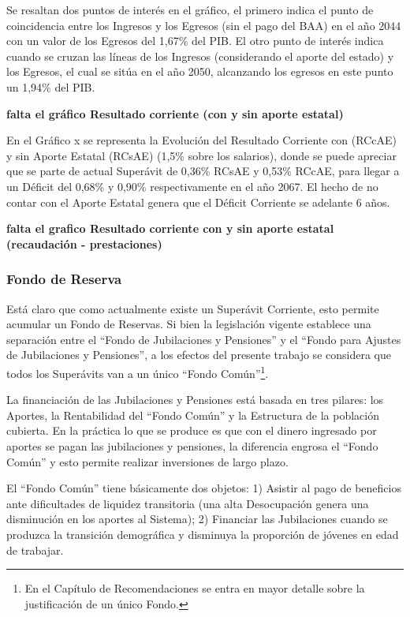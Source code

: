 \documentclass[a4paper,11pt]{article}
\begin{document}
Se resaltan dos puntos de interés en el gráfico, el primero indica el punto de coincidencia entre los Ingresos y los Egresos (sin el pago del BAA) en el año 2044 con un valor de los Egresos del 1,67\% del PIB. El otro punto de interés indica cuando se cruzan las líneas de los Ingresos (considerando el aporte del estado) y los Egresos, el cual se sitúa en el año 2050, alcanzando los egresos en este punto un 1,94\% del PIB.

\textbf{falta el gráfico Resultado corriente (con y sin aporte estatal)}

En el Gráfico x se representa la Evolución del Resultado Corriente con (RCcAE) y sin Aporte Estatal (RCsAE) (1,5\% sobre los salarios), donde se puede apreciar que se parte de actual Superávit de 0,36\% RCsAE y 0,53\% RCcAE, para llegar a un Déficit del 0,68\% y 0,90\% respectivamente en el año 2067.  El hecho de no contar con el Aporte Estatal genera que el Déficit Corriente se adelante 6 años.

\textbf{falta el grafico Resultado corriente con y sin aporte estatal (recaudación - prestaciones)}

\subsubsection{Fondo de Reserva}

Está claro que como actualmente existe un Superávit Corriente, esto permite acumular un Fondo de Reservas. Si bien la legislación vigente establece una separación entre el “Fondo de Jubilaciones y Pensiones” y el “Fondo para Ajustes de Jubilaciones y Pensiones”, a los efectos del presente trabajo se considera que todos los Superávits van a un único “Fondo Común”\footnote{En el Capítulo de Recomendaciones se entra en mayor detalle sobre la justificación de un único Fondo.}. 

La financiación de las Jubilaciones y Pensiones está basada en tres pilares: los Aportes, la Rentabilidad del “Fondo Común” y la Estructura de la población cubierta.  En la práctica lo que se produce es que con el dinero ingresado por aportes se pagan las jubilaciones y pensiones, la diferencia engrosa el “Fondo Común” y esto permite realizar inversiones de largo plazo.

El “Fondo Común” tiene básicamente dos objetos: 1) Asistir al pago de beneficios ante dificultades de liquidez transitoria (una alta Desocupación genera una disminución en los aportes al Sistema); 2) Financiar las Jubilaciones cuando se produzca la transición demográfica y disminuya la proporción de jóvenes en edad de trabajar.
\end{document}
